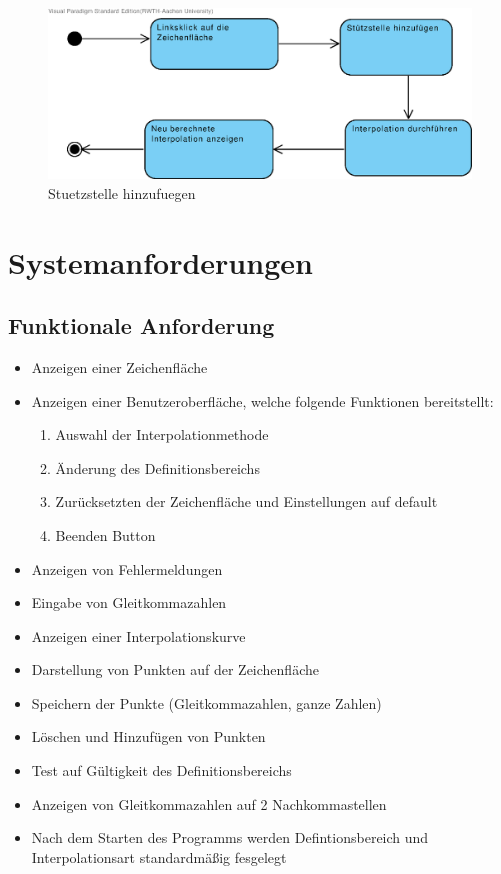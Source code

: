 \hfill \\
\hfill \\

\begin{figure}[H]
\centering
\includegraphics[width=\textwidth]{Aktivitaetsdiagramm/stutzstelleHInzufuegen.eps}
\caption{Stuetzstelle hinzufuegen}
\label{fig:Stuetzstelle hinzufuegen}
\end{figure}



\section{Systemanforderungen}

\subsection{Funktionale Anforderung}
\begin{itemize}
\item Anzeigen einer Zeichenfl\"ache
\item Anzeigen einer Benutzeroberfl\"ache, welche folgende Funktionen bereitstellt:
	\begin{enumerate}
	\item Auswahl der Interpolationmethode
	\item \"Anderung des Definitionsbereichs
	\item Zur\"ucksetzten der Zeichenfl\"ache und Einstellungen auf default
	\item Beenden Button
	\end{enumerate}
\item Anzeigen von Fehlermeldungen
\item Eingabe von Gleitkommazahlen 
\item Anzeigen einer Interpolationskurve
\item Darstellung von Punkten auf der Zeichenfl\"ache
\item Speichern der Punkte (Gleitkommazahlen, ganze Zahlen)
\item L\"oschen und Hinzuf\"ugen von Punkten
\item Test auf G\"ultigkeit des Definitionsbereichs
\item Anzeigen von Gleitkommazahlen auf 2 Nachkommastellen 
\item Nach dem Starten des Programms werden Defintionsbereich und Interpolationsart standardm\"a\ss ig fesgelegt
\end{itemize}

